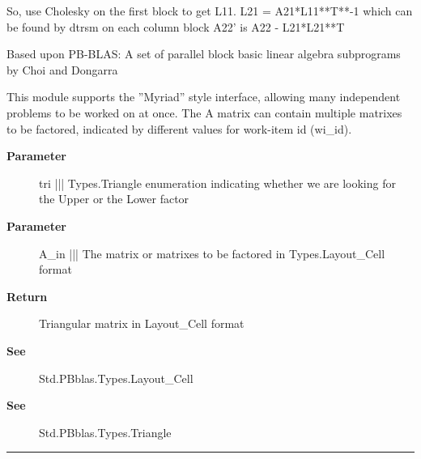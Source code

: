  So, use Cholesky on the first block to get L11. L21 = A21*L11**T**-1 which can be found by dtrsm on each column block A22' is A22 - L21*L21**T 
\par
 Based upon PB-BLAS: A set of parallel block basic linear algebra subprograms by Choi and Dongarra 


\par
 This module supports the ''Myriad'' style interface, allowing many independent problems to be worked on at once. The A matrix can contain multiple matrixes to be factored, indicated by different values for work-item id (wi\_id).



\par
\begin{description}
\item [\textbf{Parameter}] tri ||| Types.Triangle enumeration indicating whether we are looking for the Upper or the Lower factor
\item [\textbf{Parameter}] A\_in ||| The matrix or matrixes to be factored in Types.Layout\_Cell format
\item [\textbf{Return}] Triangular matrix in Layout\_Cell format
\item [\textbf{See}] Std.PBblas.Types.Layout\_Cell
\item [\textbf{See}] Std.PBblas.Types.Triangle
\end{description}

\rule{\textwidth}{0.4pt}
